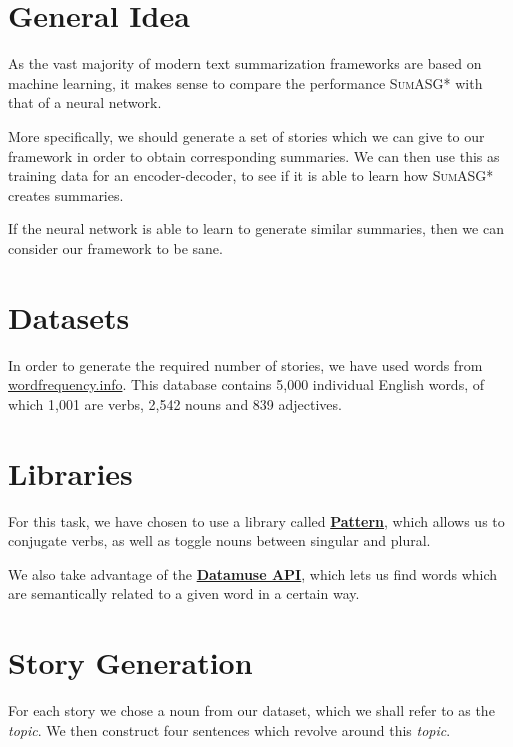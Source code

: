\label{chapter:evaluation}

\section{General Idea}

As the vast majority of modern text summarization frameworks are based on machine learning, it makes sense to compare the performance \textsc{SumASG*} with that of a neural network.

More specifically, we should generate a set of stories which we can give to our framework in order to obtain corresponding summaries. We can then use this as training data for an encoder-decoder, to see if it is able to learn how \textsc{SumASG*} creates summaries.

If the neural network is able to learn to generate similar summaries, then we can consider our framework to be sane.

\section{Datasets}

In order to generate the required number of stories, we have used words from \href{http://www.wordfrequency.info/}{wordfrequency.info}. This database contains 5,000 individual English words, of which 1,001 are verbs, 2,542 nouns and 839 adjectives.

\section{Libraries}

For this task, we have chosen to use a library called \textbf{\href{http://web.archive.org/web/20190516161631/https://www.clips.uantwerpen.be/pages/pattern-en}{Pattern}}, which allows us to conjugate verbs, as well as toggle nouns between singular and plural.

We also take advantage of the \textbf{\href{https://www.datamuse.com/api/}{Datamuse API}}, which lets us find words which are semantically related to a given word in a certain way.

\section{Story Generation}

For each story we chose a noun from our dataset, which we shall refer to as the \textit{topic}. We then construct four sentences which revolve around this \textit{topic}.

